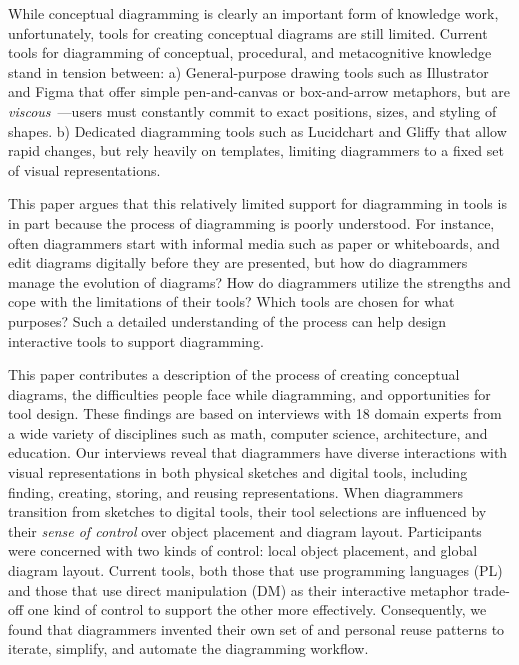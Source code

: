 

While conceptual diagramming is clearly an important form of knowledge work, unfortunately, tools for creating conceptual diagrams are still limited. Current tools for diagramming of conceptual, procedural, and metacognitive knowledge~\cite{bloomRevised} stand in tension between: a) General-purpose drawing tools such as Illustrator and Figma that offer simple pen-and-canvas or box-and-arrow metaphors, but are \emph{viscous}~\cite{green_usability_1996}---users must constantly commit to exact positions, sizes, and styling of shapes. b) Dedicated diagramming tools such as Lucidchart and Gliffy that allow rapid changes, but rely heavily on templates, limiting diagrammers to a fixed set of visual representations. 

This paper argues that this relatively limited support for diagramming in tools is in part because the process of diagramming is poorly understood. For instance, often diagrammers start with informal media such as paper or whiteboards, and edit diagrams digitally before they are presented, but how do diagrammers manage the evolution of diagrams? How do diagrammers utilize the strengths and cope with the limitations of their tools? Which tools are chosen for what purposes?  Such a detailed understanding of the process can help design interactive tools to support diagramming. 

This paper contributes a description of the process of creating conceptual diagrams, the difficulties people face while diagramming, and opportunities for tool design. These findings are based on interviews with 18 domain experts from a wide variety of disciplines such as math, computer science, architecture, and education. Our interviews reveal that diagrammers have diverse interactions with visual representations in both physical sketches and digital tools, including finding, creating, storing, and reusing representations. When diagrammers transition from sketches to digital tools, their tool selections are  influenced by their \emph{sense of control} over object placement and diagram layout. Participants were concerned with two kinds of control: local object placement, and global diagram layout. Current tools, both those that use programming languages (PL) and those that use direct manipulation (DM) as their interactive metaphor trade-off one kind of control to support the other more effectively. Consequently, we found that diagrammers invented their own set of  and personal reuse patterns to iterate, simplify, and automate the diagramming workflow. 

